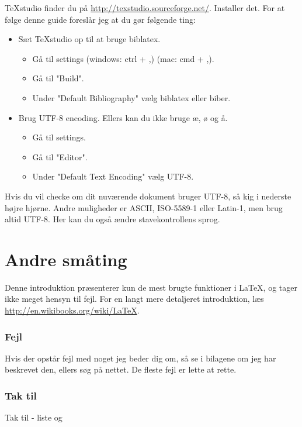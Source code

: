 TeXstudio finder du på \url{http://texstudio.sourceforge.net/}. Installer det. For at følge denne guide foreslår jeg at du gør følgende ting:
\begin{itemize}
\item Sæt TeXstudio op til at bruge biblatex.
\begin{itemize}
\item Gå til settings (windows: ctrl + ,) (mac: cmd + ,).
\item Gå til "Build".
\item Under "Default Bibliography" vælg biblatex eller biber.
\end{itemize}
\item Brug UTF-8 encoding. Ellers kan du ikke bruge æ, ø og å.
\begin{itemize}
\item Gå til settings.
\item Gå til "Editor".
\item Under "Default Text Encoding" vælg UTF-8.
\end{itemize}
\end{itemize}

Hvis du vil checke om dit nuværende dokument bruger UTF-8, så kig i nederste højre hjørne. Andre muligheder er ASCII, ISO-5589-1 eller Latin-1, men brug altid UTF-8. Her kan du også ændre stavekontrollens sprog.

\section{Andre småting}
Denne introduktion præsenterer kun de mest brugte funktioner i LaTeX, og tager ikke meget hensyn til fejl. For en langt mere detaljeret introduktion, læs \url{http://en.wikibooks.org/wiki/LaTeX}.

\subsubsection{Fejl}
Hvis der opstår fejl med noget jeg beder dig om, så se i bilagene om jeg har beskrevet den, ellers søg på nettet. De fleste fejl er lette at rette.

\subsubsection{Tak til}
Tak til - liste og 